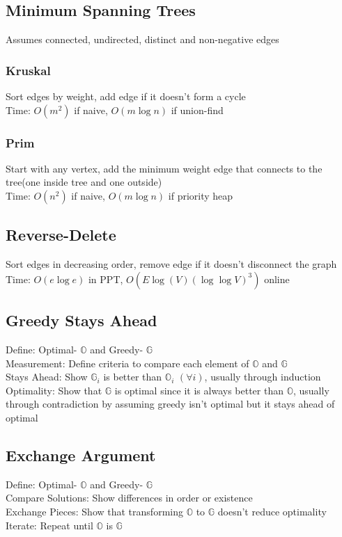 \documentclass{article}
\begin{document}
\begin{multicols*}{2}
        \subsection*{Minimum Spanning Trees}
        Assumes connected, undirected, distinct and non-negative edges
        \subsubsection*{Kruskal}
        Sort edges by weight, add edge if it doesn't form a cycle\\
        Time: $O(m^2)$ if naive, $O(m\log n)$ if union-find
        \subsubsection*{Prim}
        Start with any vertex, add the minimum weight edge that connects to the tree(one inside
        tree and one outside)\\
        Time: $O(n^2)$ if naive, $O(m\log n)$ if priority heap
        \subsection*{Reverse-Delete}
        Sort edges in decreasing order, remove edge if it doesn't disconnect the graph\\
        Time: $O(e\log e)$ in PPT, $O(E\log(V)(\log\log V)^3)$ online
        \subsection*{Greedy Stays Ahead}
        Define: Optimal- $\mathbb{O}$ and Greedy- $\mathbb{G}$\\
        Measurement: Define criteria to compare each element of $\mathbb{O}$ and $\mathbb{G}$\\
        Stays Ahead: Show $\mathbb{G}_i$ is better than $\mathbb{O}_i$ $(\forall i)$, usually
        through induction\\
        Optimality: Show that $\mathbb{G}$ is optimal since it is always better than $\mathbb{O}$,
        usually through contradiction by assuming greedy isn't optimal but it stays ahead of optimal
        \subsection*{Exchange Argument}
        Define: Optimal- $\mathbb{O}$ and Greedy- $\mathbb{G}$\\
        Compare Solutions: Show differences in order or existence\\
        Exchange Pieces: Show that transforming $\mathbb{O}$ to $\mathbb{G}$ doesn't reduce
        optimality\\
        Iterate: Repeat until $\mathbb{O}$ is $\mathbb{G}$

\end{multicols*}
\end{document}
